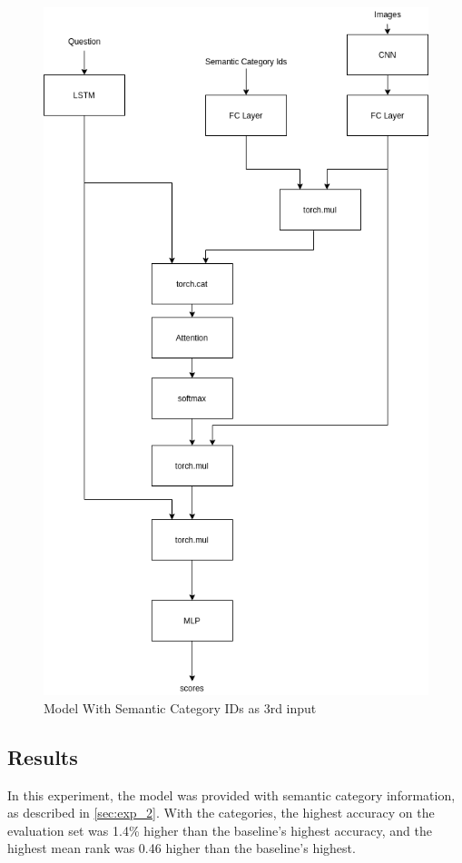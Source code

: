\begin{figure}[h]
     \centering
     \includegraphics[width=.75\textwidth]{./figure/model_w_semantic.png}
     \caption{Model With Semantic Category IDs as 3rd input}
     \label{fig:category_model}
\end{figure}

\subsection{Results}
In this experiment, the model was provided with semantic category information, as described in \ref{sec:exp_2}.
With the categories, the highest accuracy on the evaluation set was 1.4\% higher than the baseline's highest accuracy, and the highest mean rank was 0.46 higher than the baseline's highest. \newline

